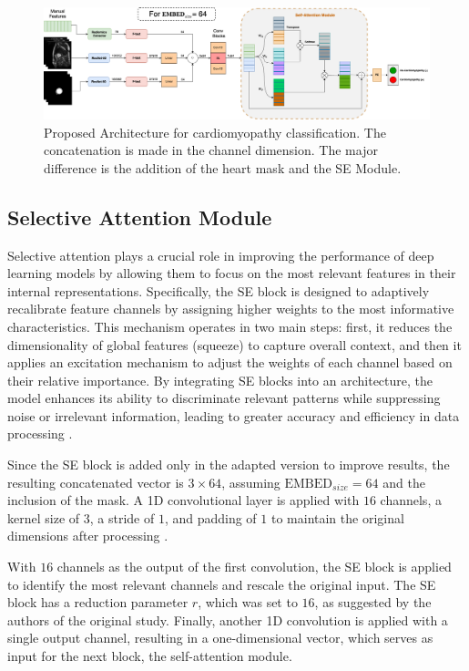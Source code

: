 \documentclass[journal,twoside,web]{ieeecolor}
\begin{document}
\begin{figure}[h]
\centerline{\includegraphics[width=\textwidth]{figures/fig02.png}}
\caption{Proposed Architecture for cardiomyopathy classification. The concatenation is made in the channel dimension. The major difference is the addition of the heart mask and the SE Module.}
\label{fig02}
\end{figure}

\subsection{Selective Attention Module}

Selective attention plays a crucial role in improving the performance of deep learning models by allowing them to focus on the most relevant features in their internal representations. Specifically, the \gls{SE} block is designed to adaptively recalibrate feature channels by assigning higher weights to the most informative characteristics. This mechanism operates in two main steps: first, it reduces the dimensionality of global features (squeeze) to capture overall context, and then it applies an excitation mechanism to adjust the weights of each channel based on their relative importance. By integrating \gls{SE} blocks into an architecture, the model enhances its ability to discriminate relevant patterns while suppressing noise or irrelevant information, leading to greater accuracy and efficiency in data processing \cite{yangNeuralNetworkDesign2024a}.

Since the \gls{SE} block is added only in the adapted version to improve results, the resulting concatenated vector is $3 \times 64$, assuming $\text{EMBED}_{size}= 64$ and the inclusion of the mask. A 1D convolutional layer is applied with $16$ channels, a kernel size of $3$, a stride of $1$, and padding of $1$ to maintain the original dimensions after processing \cite{huSqueezeandExcitationNetworks2018}.  

With $16$ channels as the output of the first convolution, the \gls{SE} block is applied to identify the most relevant channels and rescale the original input. The SE block has a reduction parameter $r$, which was set to $16$, as suggested by the authors of the original study. Finally, another 1D convolution is applied with a single output channel, resulting in a one-dimensional vector, which serves as input for the next block, the self-attention module.
\end{document}
